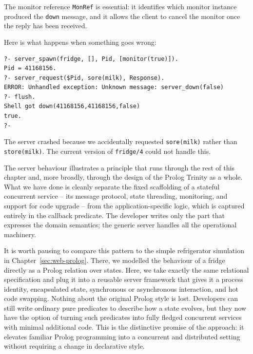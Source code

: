 \noindent The monitor reference \texttt{MonRef} is essential: it identifies which monitor instance produced the \texttt{down} message, and it allows the client to cancel the monitor once the reply has been received.

Here is what happens when something goes wrong:

\begin{verbatim}
?- server_spawn(fridge, [], Pid, [monitor(true)]).
Pid = 41168156.
?- server_request($Pid, sore(milk), Response).
ERROR: Unhandled exception: Unknown message: server_down(false)
?- flush.
Shell got down(41168156,41168156,false)
true.
?-
\end{verbatim}

\noindent The server crashed because we accidentally requested \texttt{sore(milk)} rather than \texttt{store(milk)}. The current version of \texttt{fridge/4} could not handle this.

\medskip

\noindent The server behaviour illustrates a principle that runs through the rest of
this chapter and, more broadly, through the design of the Prolog Trinity as
a whole. What we have done is cleanly separate the fixed scaffolding of a
stateful concurrent service -- its message protocol, state threading,
monitoring, and support for code upgrade -- from the application-specific
logic, which is captured entirely in the callback predicate. The developer
writes only the part that expresses the domain semantics; the generic server
handles all the operational machinery.

It is worth pausing to compare this pattern to the simple refrigerator
simulation in Chapter~\ref{sec:web-prolog}. There, we modelled the behaviour of a fridge
directly as a Prolog relation over states. Here, we take exactly the same
relational specification and plug it into a reusable server framework that
gives it a process identity, encapsulated state, synchronous or
asynchronous interaction, and hot code swapping. Nothing about the original
Prolog style is lost. Developers can still write ordinary pure predicates to
describe how a state evolves, but they now have the option of turning such
predicates into fully fledged concurrent services with minimal additional
code. This is the distinctive promise of the approach: it elevates familiar
Prolog programming into a concurrent and distributed setting without
requiring a change in declarative style.


